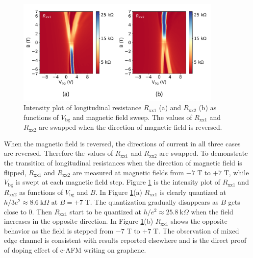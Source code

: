\documentclass[pdflatex, sectionletters, 12pt]{pittetd}    %
\begin{document}
\begin{figure}[h!]
	\centering
	\includegraphics[width=0.90\textwidth]{Drawing/MixingIntensityPlot.pdf}
	\caption{Intensity plot of longitudinal resistance $R_\mathrm{xx1}$ (a) and $R_\mathrm{xx2}$ (b) as functions of $V_\mathrm{bg}$ and magnetic field sweep. The values of $R_\mathrm{xx1}$ and $R_\mathrm{xx2}$ are swapped when the direction of magnetic field is reversed.}
	\label{FIG:MixingIntensityPlot}
\end{figure}

When the magnetic field is reversed, the directions of current in all three cases are reversed. Therefore the values of $R_\mathrm{xx1}$ and $R_\mathrm{xx2}$ are swapped. To demonstrate the transition of longitudinal resistances when the direction of magnetic field is flipped, $R_\mathrm{xx1}$ and $R_\mathrm{xx2}$ are measured at magnetic fields from $-7$ T to $+7$ T, while $V_\mathrm{bg}$ is swept at each magnetic field step. Figure \ref{FIG:MixingIntensityPlot} is the intensity plot of $R_\mathrm{xx1}$ and $R_\mathrm{xx2}$ as functions of $V_\mathrm{bg}$ and $B$. In Figure \ref{FIG:MixingIntensityPlot}(a) $R_\mathrm{xx1}$ is clearly quantized at $h/3e^2 \approx 8.6 \ \mathrm{k}\Omega$ at $B = +7$ T. The quantization gradually disappears as $B$ gets close to 0. Then $R_\mathrm{xx1}$ start to be quantized at $h/e^2 \approx 25.8 \ \mathrm{k}\Omega$ when the field increases in the opposite direction. In Figure \ref{FIG:MixingIntensityPlot}(b) $R_\mathrm{xx1}$ shows the opposite behavior as the field is stepped from $-7$ T to $+7$ T. The observation of mixed edge channel is consistent with results reported elsewhere\cite{williams2007quantum, lohmann2009four, amet2014selective, abanin2007quantized, amet2014selective, ki2010dependence, klimov2015edge, woszczyna2011graphene, ozyilmaz2007electronic, schmidt2013mixing} and is the direct proof of doping effect of c-AFM writing on graphene.

\end{document}
